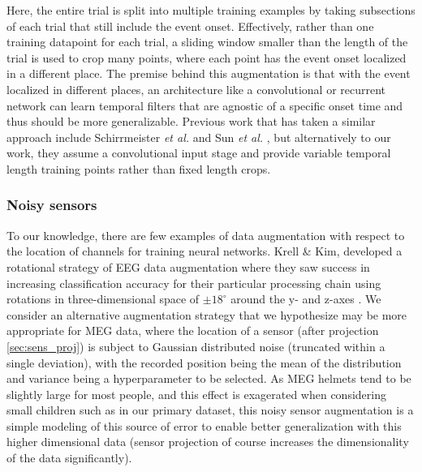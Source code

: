 \documentclass[utf8]{frontiersSCNS} %
\begin{document}
Here, the entire trial is split into multiple training examples by taking subsections of each trial that still include the event onset. Effectively, rather than one training datapoint for each trial, a sliding window smaller than the length of the trial is used to crop many points, where each point has the event onset localized in a different place. The premise behind this augmentation is that with the event localized in different places, an architecture like a convolutional or recurrent network can learn temporal filters that are agnostic of a specific onset time and thus should be more generalizable. Previous work that has taken a similar approach include Schirrmeister {\em et al.} \cite{Schirrmeister2017} and Sun {\em et al.} \cite{Sun}, but alternatively to our work, they assume a convolutional input stage and provide variable temporal length training points rather than fixed length crops. %



\subsubsection{Noisy sensors}

To our knowledge, there are few examples of data augmentation with respect to the location of channels for training neural networks. Krell \& Kim, developed a rotational strategy of EEG data augmentation where they saw success in increasing classification accuracy for their particular processing chain using rotations in three-dimensional space of $\pm 18^{\circ}$ around the y- and z-axes \cite{Krell2017}. We consider an alternative augmentation strategy that we hypothesize may be more appropriate for MEG data, where the location of a sensor (after projection \ref{sec:sens_proj}) is subject to Gaussian distributed noise (truncated within a single deviation), with the recorded position being the mean of the distribution and variance being a hyperparameter to be selected. As MEG helmets tend to be slightly large for most people, and this effect is exagerated when considering small children such as in our primary dataset, this noisy sensor augmentation is a simple modeling of this source of error to enable better generalization with this higher dimensional data (sensor projection of course increases the dimensionality of the data significantly).
\end{document}
